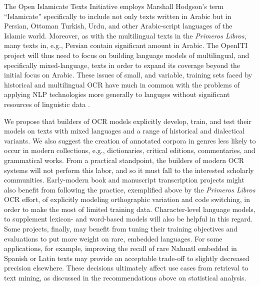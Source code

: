 \documentclass[twoside,11pt]{report}
\begin{document}
The Open Islamicate Texts Initiative \citep[OpenITI:][]{miller18:_digit_textual_herit_premod_islam_world} employs Marshall Hodgson's \citeyearpar{hodgson74:_ventur_islam} term ``Islamicate'' specifically to include not only texts written in Arabic but in Persian, Ottoman Turkish, Urdu, and other Arabic-script languages of the Islamic world. Moreover, as with the multilingual texts in the \emph{Primeros Libros}, many texts in, e.g., Persian contain significant amount in Arabic. The OpenITI project will thus need to focus on building language models of multilingual, and specifically mixed-language, texts in order to expand its coverage beyond the initial focus on Arabic.  These issues of small, and variable, training sets faced by historical and multilingual OCR have much in common with the problems of applying NLP technologies more generally to languges without significant resources of linguistic data \citep{mager18:_chall_languag_techn_indig_languag_americ}. 

We propose that builders of OCR models explicitly develop, train, and test their models on texts with mixed languages and a range of historical and dialectical variants.  We also suggest the creation of annotated corpora in genres less likely to occur in modern collections, e.g., dictionaries, critical editions, commentaries, and grammatical works. From a practical standpoint, the builders of modern OCR systems will not perform this labor, and so it must fall to the interested scholarly communities. Early-modern book and manuscript transcription projects might also benefit from following the practice, exemplified above by the \emph{Primeros Libros} OCR effort, of explicitly modeling orthographic variation and code switching, in order to make the most of limited training data. Character-level language models, to supplement lexicon- and word-based models will also be helpful in this regard. Some projects, finally, may benefit from tuning their training objectives and evaluations to put more weight on rare, embedded languages. For some applications, for example, improving the recall of rare Nahuatl embedded in Spanish or Latin texts may provide an acceptable trade-off to slightly decreased precision elsewhere. These decisions ultimately affect use cases from retrieval to text mining, as discussed in the recommendations above on statistical analysis.
\end{document}
